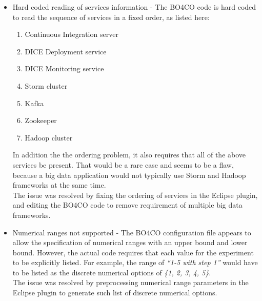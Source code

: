 \begin{itemize}
\item Hard coded reading of services information - The BO4CO code is hard coded to read the sequence of services in a fixed order, as listed here: 
	\begin{enumerate}
	\item Continuous Integration server
    \item DICE Deployment service
    \item DICE Monitoring service
    \item Storm cluster
    \item Kafka
    \item Zookeeper
    \item Hadoop cluster
	\end{enumerate}
In addition the the ordering problem, it also requires that all of the above services be present. That would be a rare case and seems to be a flaw, because a big data application would not typically use Storm and Hadoop frameworks at the same time.\\
The issue was resolved by fixing the ordering of services in the Eclipse plugin, and editing the BO4CO code to remove requirement of multiple big data frameworks.
\item Numerical ranges not supported - The BO4CO configuration file appears to allow the specification of numerical ranges with an upper bound and lower bound. However, the actual code requires that each value for the experiment to be explicitly listed. For example, the range of \textit{``1-5 with step 1''} would have to be listed as the discrete numerical options of \textit{\{1, 2, 3, 4, 5\}}.\\
The issue was resolved by preprocessing numerical range parameters in the Eclipse plugin to generate such list of discrete numerical options.
\end{itemize}





























